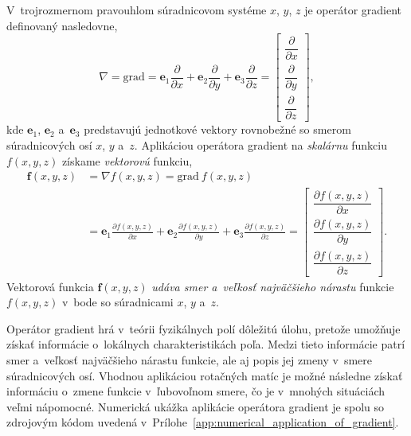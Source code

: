 \documentclass[a4paper, 12pt]{book}
\newcommand{\grad}{\mathrm{grad}}
\let\vec\mathbf
\begin{document}
V~trojrozmernom pravouhlom súradnicovom systéme $x$, $y$, $z$ je operátor
gradient definovaný nasledovne,
%
\begin{equation}
\label{eq:gradient}
\nabla = \grad = \vec e_1 \frac{\partial}{\partial x} + \vec e_2
\frac{\partial}{\partial y} + \vec e_3 \frac{\partial}{\partial z} =
\begin{bmatrix}
\dfrac{\partial}{\partial x} \\[2ex]
\dfrac{\partial}{\partial y} \\[2ex]
\dfrac{\partial}{\partial z}
\end{bmatrix}
{,}
\end{equation}
%
kde $\vec e_1$, $\vec e_2$ a~$\vec e_3$ predstavujú jednotkové vektory
rovnobežné so smerom súradnicových osí $x$, $y$ a~$z$.  Aplikáciou operátora
gradient na \emph{skalárnu} funkciu $f(x, y, z)$ získame \emph{vektorovú}
funkciu,
%
\begin{equation}
\begin{split}
\vec f(x, y, z) &= \nabla f(x, y, z) = \grad \ f(x, y, z)\\
%
&= \vec e_1 \frac{\partial f(x, y, z)}{\partial x} + \vec e_2 \frac{\partial
f(x, y, z)}{\partial y} + \vec e_3 \frac{\partial f(x, y, z)}{\partial z} =
\begin{bmatrix}
\dfrac{\partial f(x, y, z)}{\partial x} \\[2ex]
\dfrac{\partial f(x, y, z)}{\partial y} \\[2ex]
\dfrac{\partial f(x, y, z)}{\partial z}
\end{bmatrix}
{.}
\end{split}
\end{equation}
%
Vektorová funkcia $\vec f(x, y, z)$ \emph{udáva smer a~veľkosť najväčšieho
nárastu} funkcie $f(x, y, z)$ v~bode so súradnicami $x$, $y$ a~$z$.

Operátor gradient hrá v~teórii fyzikálnych polí dôležitú úlohu, pretože
umožňuje získať informácie o~lokálnych charakteristikách poľa.  Medzi tieto
informácie patrí smer a~veľkosť najväčšieho nárastu funkcie, ale aj popis jej
zmeny v~smere súradnicových osí.  Vhodnou aplikáciou rotačných matíc je možné
následne získať informáciu o~zmene funkcie v~ľubovoľnom smere, čo je v~mnohých
situáciách veľmi nápomocné.  Numerická ukážka aplikácie operátora gradient je
spolu so zdrojovým kódom uvedená
v~Prílohe~\ref{app:numerical_application_of_gradient}.
\end{document}
